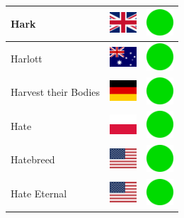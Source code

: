 \documentclass[12pt, a4paper, twoside]{report}
\begin{document}
\begin{center}
\begin{longtable}{|p{5cm}|p{2cm}|p{2cm}|}
 Hark                                                       & \includegraphics[width=1cm]{4x3/gb} &   \includegraphics[width=1cm]{likes/y} \\ \hline
 Harlott                                                    & \includegraphics[width=1cm]{4x3/au} &   \includegraphics[width=1cm]{likes/y} \\ \hline
 Harvest their Bodies                                       & \includegraphics[width=1cm]{4x3/de} &   \includegraphics[width=1cm]{likes/y} \\ \hline
 Hate                                                       & \includegraphics[width=1cm]{4x3/pl} &   \includegraphics[width=1cm]{likes/y} \\ \hline
 Hatebreed                                                  & \includegraphics[width=1cm]{4x3/us} &   \includegraphics[width=1cm]{likes/y} \\ \hline
 Hate Eternal                                               & \includegraphics[width=1cm]{4x3/us} &   \includegraphics[width=1cm]{likes/y} \\ \hline

\end{longtable}
\end{center}
\end{document}
